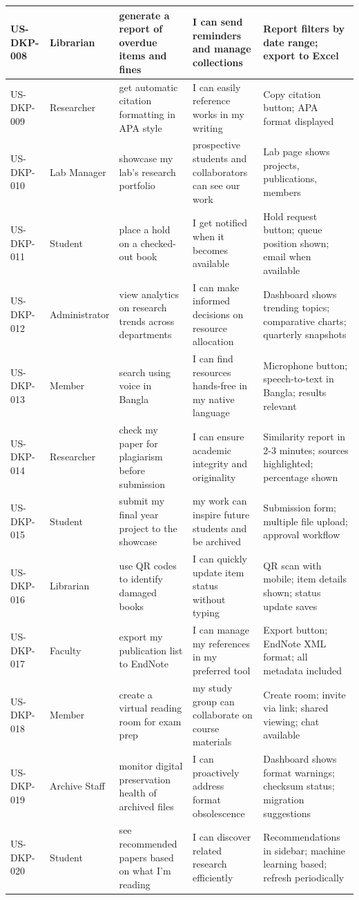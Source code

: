 \documentclass[12pt,a4paper]{report}
\begin{document}
\begin{longtable}{|p{2cm}|p{2cm}|p{3cm}|p{3cm}|p{4cm}|}
US-DKP-008 & Librarian & generate a report of overdue items and fines & I can send reminders and manage collections & Report filters by date range; export to Excel \\ \hline
US-DKP-009 & Researcher & get automatic citation formatting in APA style & I can easily reference works in my writing & Copy citation button; APA format displayed \\ \hline
US-DKP-010 & Lab Manager & showcase my lab's research portfolio & prospective students and collaborators can see our work & Lab page shows projects, publications, members \\ \hline
US-DKP-011 & Student & place a hold on a checked-out book & I get notified when it becomes available & Hold request button; queue position shown; email when available \\ \hline
US-DKP-012 & Administrator & view analytics on research trends across departments & I can make informed decisions on resource allocation & Dashboard shows trending topics; comparative charts; quarterly snapshots \\ \hline
US-DKP-013 & Member & search using voice in Bangla & I can find resources hands-free in my native language & Microphone button; speech-to-text in Bangla; results relevant \\ \hline
US-DKP-014 & Researcher & check my paper for plagiarism before submission & I can ensure academic integrity and originality & Similarity report in 2-3 minutes; sources highlighted; percentage shown \\ \hline
US-DKP-015 & Student & submit my final year project to the showcase & my work can inspire future students and be archived & Submission form; multiple file upload; approval workflow \\ \hline
US-DKP-016 & Librarian & use QR codes to identify damaged books & I can quickly update item status without typing & QR scan with mobile; item details shown; status update saves \\ \hline
US-DKP-017 & Faculty & export my publication list to EndNote & I can manage my references in my preferred tool & Export button; EndNote XML format; all metadata included \\ \hline
US-DKP-018 & Member & create a virtual reading room for exam prep & my study group can collaborate on course materials & Create room; invite via link; shared viewing; chat available \\ \hline
US-DKP-019 & Archive Staff & monitor digital preservation health of archived files & I can proactively address format obsolescence & Dashboard shows format warnings; checksum status; migration suggestions \\ \hline
US-DKP-020 & Student & see recommended papers based on what I'm reading & I can discover related research efficiently & Recommendations in sidebar; machine learning based; refresh periodically \\ \hline
\end{longtable}
\end{document}
